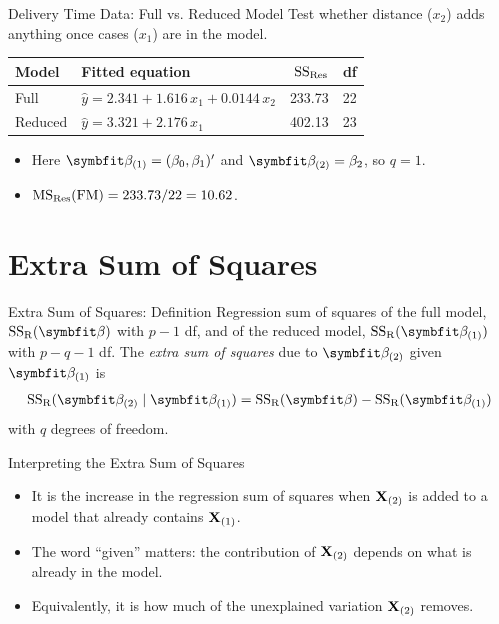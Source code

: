 \begin{frame}{Delivery Time Data: Full vs. Reduced Model}
    Test whether distance ($x_2$) adds anything once cases ($x_1$) are in the model.
    \svspace{0.5em}
    \begin{center}
        \small
        \begin{tabular}{llrr}
            \toprule
            Model & Fitted equation & $\mathrm{SS}_{\mathrm{Res}}$ & df \\
            \midrule
            Full & $\hat y = 2.341 + 1.616\,x_1 + 0.0144\,x_2$ & 233.73 & 22 \\
            Reduced & $\hat y = 3.321 + 2.176\,x_1$ & 402.13 & 23 \\
            \bottomrule
        \end{tabular}
    \end{center}
    \begin{itemize}
        \item Here $\bbeta_{(1)}=(\beta_0,\beta_1)'$ and $\bbeta_{(2)}=\beta_2$, so $q=1$.
        \item $\mathrm{MS}_{\mathrm{Res}}(\mathrm{FM}) = 233.73/22 = 10.62$.
    \end{itemize}
\end{frame}


\section{Extra Sum of Squares}


\begin{frame}{Extra Sum of Squares: Definition}
    Regression sum of squares of the full model, $\SSR(\bbeta)$ with $p-1$ df, and of the reduced model, $\SSR(\bbeta_{(1)})$ with $p-q-1$ df. The \emph{extra sum of squares} due to $\bbeta_{(2)}$ given $\bbeta_{(1)}$ is
    \begin{align}
        \SSR(\bbeta_{(2)}\mid\bbeta_{(1)}) = \SSR(\bbeta) - \SSR(\bbeta_{(1)})
        \label{eq:extra-ss}
    \end{align}
    with $q$ degrees of freedom.
    \svspace{0.5em}

\end{frame}


\begin{frame}{Interpreting the Extra Sum of Squares}
    \begin{itemize}
        \item It is the increase in the regression sum of squares when $\mathbf{X}_{(2)}$ is added to a model that already contains $\mathbf{X}_{(1)}$.
        \item The word ``given'' matters: the contribution of $\mathbf{X}_{(2)}$ depends on what is already in the model.
        \item Equivalently, it is how much of the unexplained variation $\mathbf{X}_{(2)}$ removes.
    \end{itemize}
\end{frame}


